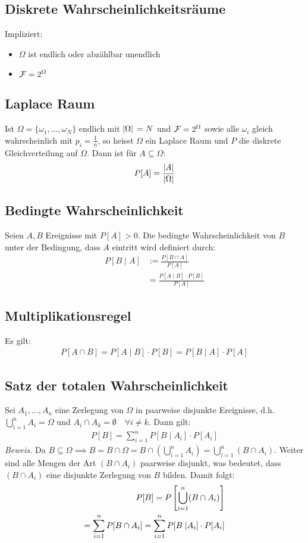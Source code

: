 \subsection*{Diskrete Wahrscheinlichkeitsräume}
Impliziert:
\begin{itemize}
  \item $\Omega$ ist endlich oder abzählbar unendlich
  \item $\mathcal{F} = 2^{\Omega}$
\end{itemize}
\subsection*{Laplace Raum}
Ist $\Omega = \{\omega_1, \dots, \omega_N\}$ endlich mit $\abs*{\Omega} = N$
und $\mathcal{F} = 2^\Omega$ sowie alle $\omega_i$ gleich wahrscheinlich mit $p_i =
  \frac{1}{n}$, so heisst $\Omega$ ein Laplace Raum und $P$ die diskrete
Gleichverteilung auf $\Omega$. Dann ist für $A \subseteq \Omega$:
\begin{align*}
  P[A] = \frac{\abs{A}}{\abs{\Omega}}
\end{align*}
\subsection*{Bedingte Wahrscheinlichkeit}
Seien $A, B$ Ereignisse mit $P[A] > 0$. Die bedingte Wahrscheinlichkeit von $B$
unter der Bedingung, dass $A$ eintritt wird definiert durch:
\begin{align*}
  P[B \;|\; A] & := \frac{P[B \cap A]}{P[A]}            \\
               & = \frac{P[A \;|\; B] \cdot P[B]}{P[A]}
\end{align*}
\subsection*{Multiplikationsregel}
Es gilt:
\begin{align*}
  P[A \cap B] = P[A \;|\; B] \cdot P[B] = P[B \;|\; A] \cdot P[A]
\end{align*}
\subsection*{Satz der totalen Wahrscheinlichkeit}
Sei $A_1, \dots, A_n$ eine Zerlegung von $\Omega$ in paarweise disjunkte
Ereignisse, d.h. $\bigcup_{i = 1}^n A_i = \Omega$ und $A_i \cap A_k = \emptyset
  \quad \forall i \neq k$. Dann gilt:
\begin{align*}
  P[B] = \sum_{i = 1}^n P[B \; | \; A_i] \cdot P[A_i]
\end{align*}
\emph{Beweis.}
Da $B \subseteq \Omega \implies B = B \cap \Omega
  = B \cap  (\bigcup_{i=1}^n A_i) = \bigcup_{i = 1}^n  (B \cap A_i)$.
Weiter sind alle Mengen der Art $ (B \cap A_i)$ paarweise disjunkt,
was bedeutet, dass $ (B \cap A_i)$ eine disjunkte Zerlegung von $B$
bilden. Damit folgt:
\begin{align*}
  P[B] = P \left[ \bigcup_{i = 1}^n  (B \cap A_i)\right] \\
  = \sum_{i = 1}^n P[B \cap A_i] = \sum_{i = 1}^n P[B \; | A_i] \cdot P[A_i]
\end{align*}
